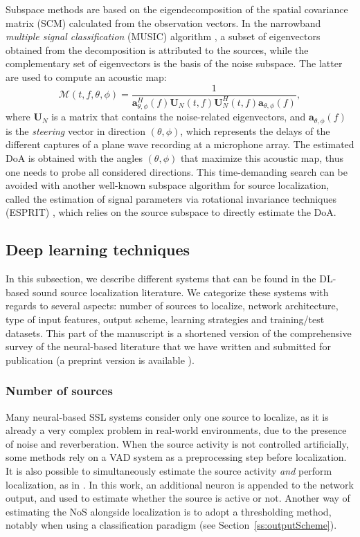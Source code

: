 Subspace methods are based on the eigendecomposition of the spatial covariance matrix (SCM) calculated from the observation vectors. In the narrowband \textit{multiple signal classification} (MUSIC) algorithm \cite{schmidt_multiple_1986}, a subset of eigenvectors obtained from the decomposition is attributed to the sources, while the complementary set of eigenvectors is the basis of the noise subspace. The latter are used to compute an acoustic map:
\begin{equation}
    \mathcal{M}(t,f,\theta,\phi) = \frac{1}{\mathbf{a}_{\theta,\phi}^H(f) \mathbf{U}_N(t,f) \mathbf{U}_N^H(t,f) \mathbf{a}_{\theta,\phi}(f)},
\end{equation}
where $\mathbf{U}_N$ is a matrix that contains the noise-related eigenvectors, and $\mathbf{a}_{\theta,\phi}(f)$ is the \textit{steering} vector in direction $(\theta,\phi)$, which represents the delays of the different captures of a plane wave recording at a microphone array. The estimated DoA is obtained with the angles $(\theta,\phi)$ that maximize this acoustic map, thus one needs to probe all considered directions. This time-demanding search can be avoided with another well-known subspace algorithm for source localization, called the estimation of signal parameters via rotational invariance techniques (ESPRIT) \cite{roy_esprit-estimation_1989}, which relies on the source subspace to directly estimate the DoA.

\subsection{Deep learning techniques}
\label{ss:neuralSSL}

In this subsection, we describe different systems that can be found in the DL-based sound source localization literature. We categorize these systems with regards to several aspects: number of sources to localize, network architecture, type of input features, output scheme, learning strategies and training/test datasets. This part of the manuscript is a shortened version of the comprehensive survey of the neural-based literature that we have written and submitted for publication (a preprint version is available \cite{grumiaux_survey_2021}).


\subsubsection{Number of sources}

Many neural-based SSL systems consider only one source to localize, as it is already a very complex problem in real-world environments, due to the presence of noise and reverberation. When the source activity is not controlled artificially, some methods rely on a VAD system as a preprocessing step before localization. It is also possible to simultaneously estimate the source activity \emph{and} perform localization, as in \cite{yalta_sound_2017}. In this work, an additional neuron is appended to the network output, and used to estimate whether the source is active or not. Another way of estimating the NoS alongside localization is to adopt a thresholding method, notably when using a classification paradigm (see Section~\ref{ss:outputScheme}).

